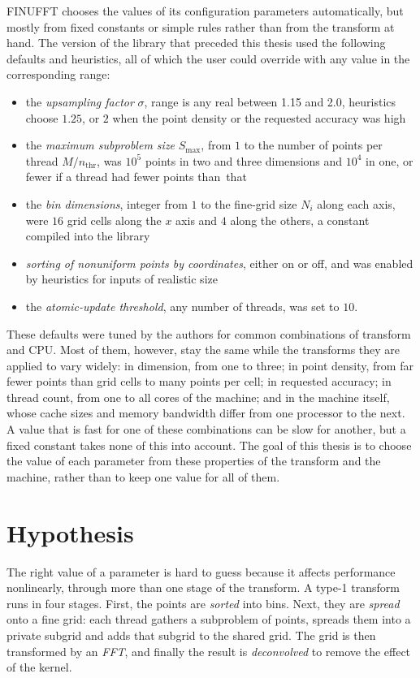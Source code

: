 FINUFFT chooses the values of its configuration parameters automatically, but
mostly from fixed constants or simple rules rather than from the transform at
hand. The version of the library that preceded this thesis used the following
defaults and heuristics, all of which the user could override with any value in the corresponding
range:
\begin{itemize}
    \item the \emph{upsampling factor} $\sigma$, range is any real between 1.15 and 2.0, heuristics choose 
    $1.25$, or $2$ when the point density or the requested accuracy was high
    \item the \emph{maximum subproblem size} $S_{\max}$, from $1$ to the number of
    points per thread $M/n_{\mathrm{thr}}$, was $10^5$ points in two
    and three dimensions and $10^4$ in one, or fewer if a thread had fewer points
    than~that
    \item the \emph{bin dimensions}, integer from $1$ to the fine-grid size $N_i$ along
    each axis, were $16$ grid cells along the $x$ axis and
    $4$ along the others, a constant compiled into the library
    \item \emph{sorting of nonuniform points by coordinates}, either on or off,
    and was enabled by heuristics for inputs of
    realistic size
    \item the \emph{atomic-update threshold}, any number of threads, was set to $10$.
\end{itemize}
These defaults were tuned by the authors for common combinations of transform
and CPU. Most of them, however, stay the same while the transforms they are
applied to vary widely: in dimension, from one to three; in point density, from
far fewer points than grid cells to many points per cell; in requested accuracy;
in thread count, from one to all cores of the machine; and in the machine
itself, whose cache sizes and memory bandwidth differ from one processor to the
next. A value that is fast for one of these combinations can be slow for
another, but a fixed constant takes none of this into account. The goal of
this thesis is to choose the value of each parameter from these properties of
the transform and the machine, rather than to keep one value for all of them.

\section{Hypothesis}
\label{sec:hypothesis}

The right value of a parameter is hard to guess because it affects performance
nonlinearly, through more than one stage of the transform. A type-1 transform
runs in four stages. First, the points are \emph{sorted} into bins. Next, they
are \emph{spread} onto a fine grid: each thread gathers a subproblem of points,
spreads them into a private subgrid and adds that subgrid to the shared grid.
The grid is then transformed by an \emph{FFT}, and finally the result is
\emph{deconvolved} to remove the effect of the kernel.

